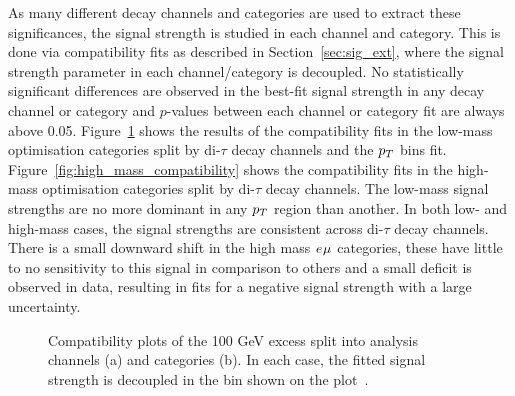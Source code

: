 As many different decay channels and categories are used to extract these significances, the signal strength is studied in each channel and category.
This is done via compatibility fits as described in Section~\ref{sec:sig_ext}, where the signal strength parameter in each channel/category is decoupled.
No statistically significant differences are observed in the best-fit signal strength in any decay channel or category and $p$-values between each channel or category fit are always above 0.05.
Figure~\ref{fig:low_mass_compatibility} shows the results of the compatibility fits in the low-mass optimisation categories split by di-$\tau$ decay channels and the $p_{T}$ bins fit. 
Figure~\ref{fig:high_mass_compatibility} shows the compatibility fits in the high-mass optimisation categories split by di-$\tau$ decay channels.
The low-mass signal strengths are no more dominant in any $p_{T}$ region than another.
In both low- and high-mass cases, the signal strengths are consistent across di-$\tau$ decay channels.
There is a small downward shift in the high mass $e_{}\mu_{}$ categories, these have little to no sensitivity to this signal in comparison to others and a small deficit is observed in data, resulting in fits for a negative signal strength with a large uncertainty. 

\begin{figure}[!hbtp]
\centering
\caption[Plots of the compatibility of the 100 GeV excess across the di-$\tau$ decay channels and categories.]{Compatibility plots of the 100 GeV excess split into analysis channels (a) and categories (b). In each case, the fitted signal strength is decoupled in the bin shown on the plot~\cite{CMS:2022rbd}.}
\label{fig:low_mass_compatibility}
\end{figure}

